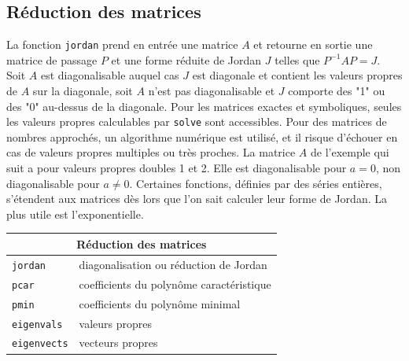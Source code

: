 \documentclass{article}
\begin{document}
\begin{giacjshere}
\subsection{R\'eduction des matrices}
%
La fonction \verb|jordan| prend en entr\'ee une matrice $A$ et retourne en
sortie une matrice de passage $P$ et une forme r\'eduite de Jordan $J$ telles
que $P^{-1}A P=J$. Soit $A$ est diagonalisable auquel cas $J$ est
diagonale et contient les valeurs propres de $A$ sur la diagonale,
soit $A$ n'est pas diagonalisable et $J$ comporte des "1" ou des "0"
au-dessus de la diagonale. Pour les matrices exactes et symboliques,
seules les valeurs propres calculables par
\verb|solve| sont accessibles. Pour des matrices de nombres approch\'es,
un algorithme num\'erique est utilis\'e, et il risque
d'\'echouer en cas de valeurs propres multiples ou tr\`es proches.
La matrice $A$ de l'exemple qui suit a pour valeurs propres doubles 1
et 2. Elle est diagonalisable pour
$a=0$, non diagonalisable pour $a\neq 0$.
Certaines fonctions, d\'efinies par des s\'eries
enti\`eres, s'\'etendent aux matrices d\`es lors que l'on sait calculer
leur forme de Jordan. La plus utile est l'exponentielle.
 
\begin{center}
\begin{tabular}{|ll|}
\hline
\multicolumn{2}{|c|}{\bf R\'eduction des matrices}\\
\hline\hline
\verb|jordan| & diagonalisation ou r\'eduction de Jordan\\
\verb|pcar| & coefficients du polyn\^ome caract\'eristique\\
\verb|pmin| & coefficients du polyn\^ome minimal\\
\verb|eigenvals| & valeurs propres\\
\verb|eigenvects| & vecteurs propres\\
\hline
\end{tabular}
\end{center}
%

\end{giacjshere}
\end{document}

